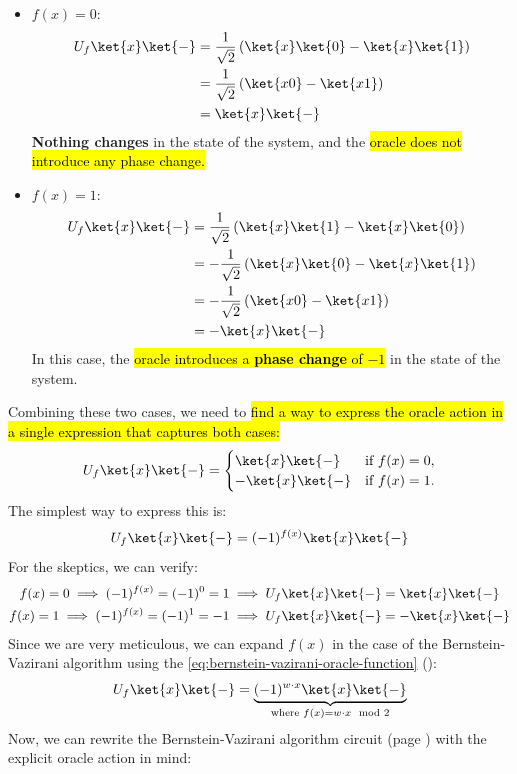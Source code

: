 \begin{itemize}
    \item $f(x) = 0$:
    \begin{align*}
        U_f\ket{x}\ket{-} &= \frac{1}{\sqrt{2}} \left(
            \ket{x}\ket{0} - \ket{x}\ket{1}
        \right) \\
        &= \frac{1}{\sqrt{2}} \left(
            \ket{x0} - \ket{x1}
        \right) \\
        &= \ket{x}\ket{-}
    \end{align*}
    \textbf{Nothing changes} in the state of the system, and the \hl{oracle does not introduce any phase change.}

    \item $f(x) = 1$:
    \begin{align*}
        U_f\ket{x}\ket{-} &= \frac{1}{\sqrt{2}} \left(
            \ket{x}\ket{1} - \ket{x}\ket{0}
        \right) \\
        &= -\frac{1}{\sqrt{2}} \left(
            \ket{x}\ket{0} - \ket{x}\ket{1}
        \right) \\
        &= -\frac{1}{\sqrt{2}} \left(
            \ket{x0} - \ket{x1}
        \right) \\
        &= -\ket{x}\ket{-}
    \end{align*}
    In this case, the \hl{oracle introduces a \textbf{phase change} of $-1$} in the state of the system.
\end{itemize}
Combining these two cases, we need to \hl{find a way to express the oracle action in a single expression that captures both cases:}
\begin{equation*}
    U_f\ket{x}\ket{-} = \begin{cases}
        \ket{x}\ket{-} & \text{if } f(x) = 0, \\
        -\ket{x}\ket{-} & \text{if } f(x) = 1.
    \end{cases}
\end{equation*}
The simplest way to express this is:
\begin{equation}\label{eq:bernstein-vazirani-oracle-action}
    U_f\ket{x}\ket{-} = (-1)^{f(x)}\ket{x}\ket{-}
\end{equation}
For the skeptics, we can verify:
\begin{gather*}
    f(x) = 0 \implies (-1)^{f(x)} = (-1)^0 = 1 \implies U_f\ket{x}\ket{-} = \ket{x}\ket{-} \\
    f(x) = 1 \implies (-1)^{f(x)} = (-1)^1 = -1 \implies U_f\ket{x}\ket{-} = -\ket{x}\ket{-}
\end{gather*}
Since we are very meticulous, we can expand $f(x)$ in the case of the Bernstein-Vazirani algorithm using the \autoref{eq:bernstein-vazirani-oracle-function} ():
\begin{equation}\label{eq:bernstein-vazirani-oracle-action-expanded}
    U_f\ket{x}\ket{-} = \underbrace{(-1)^{w \cdot x}\ket{x}\ket{-}}_{\text{where } f(x) = w \cdot x \mod 2}
\end{equation}
Now, we can rewrite the Bernstein-Vazirani algorithm circuit (page ) with the explicit oracle action in mind:


